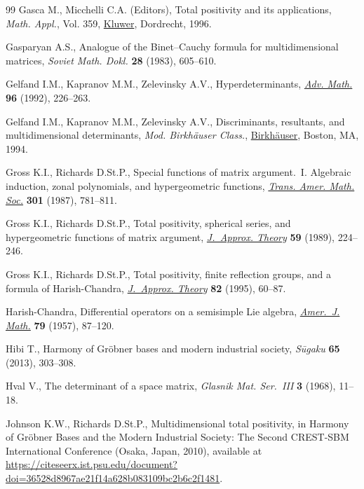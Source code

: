 \begin{thebibliography}{99}
Gasca M., Micchelli C.A. (Editors), Total positivity and its applications,
 \textit{Math. Appl.}, Vol. 359,
 \href{https://doi.org/10.1007/978-94-015-8674-0}{Kluwer}, Dordrecht, 1996.

Gasparyan A.S., Analogue of the {B}inet--{C}auchy formula for multidimensional
 matrices, \textit{Soviet Math. Dokl.} \textbf{28} (1983), 605--610.

Gelfand I.M., Kapranov M.M., Zelevinsky A.V., Hyperdeterminants,
 \href{https://doi.org/10.1016/0001-8708(92)90056-Q}{\textit{Adv. Math.}}
 \textbf{96} (1992), 226--263.

Gelfand I.M., Kapranov M.M., Zelevinsky A.V., Discriminants, resultants, and
 multidimensional determinants, \textit{Mod. Birkh\"auser Class.},
 \href{https://doi.org/10.1007/978-0-8176-4771-1}{Birkh\"auser}, Boston, MA,
 1994.

Gross K.I., Richards D.St.P., Special functions of matrix argument.~{I}.
 {A}lgebraic induction, zonal polynomials, and hypergeometric functions,
 \href{https://doi.org/10.2307/2000670}{\textit{Trans. Amer. Math. Soc.}}
 \textbf{301} (1987), 781--811.

Gross K.I., Richards D.St.P., Total positivity, spherical series, and
 hypergeometric functions of matrix argument,
 \href{https://doi.org/10.1016/0021-9045(89)90153-6}{\textit{J.~Approx.
 Theory}} \textbf{59} (1989), 224--246.

Gross K.I., Richards D.St.P., Total positivity, finite reflection groups, and a
 formula of {H}arish-{C}handra,
 \href{https://doi.org/10.1006/jath.1995.1068}{\textit{J.~Approx. Theory}}
 \textbf{82} (1995), 60--87.

Harish-Chandra, Differential operators on a semisimple {L}ie algebra,
 \href{https://doi.org/10.2307/2372387}{\textit{Amer.~J. Math.}} \textbf{79}
 (1957), 87--120.

Hibi T., Harmony of {G}r\"obner bases and modern industrial society,
 \textit{S\={u}gaku} \textbf{65} (2013), 303--308.

Hval V., The determinant of a space matrix, \textit{Glasnik Mat. Ser.~{III}}
 \textbf{3} (1968), 11--18.

Johnson K.W., Richards D.St.P., Multidimensional total positivity, in Harmony of
 {G}r\"obner {B}ases and the {M}odern {I}ndustrial {S}ociety: {T}he {S}econd
 {CREST}-{SBM} {I}nternational {C}onference (Osaka, Japan, 2010), available at
 \url{https://citeseerx.ist.psu.edu/document?doi=36528d8967ae21f14a628b083109bc2b6c2f1481}.


\end{thebibliography}
